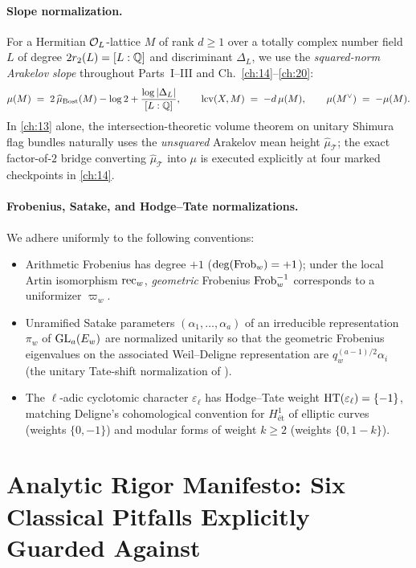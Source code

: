 \paragraph{Slope normalization.}
For a Hermitian $\mathcal{O}_L$-lattice $M$ of rank $d \ge 1$ over a totally complex number field $L$ of degree $2 r_2(L) = [L:\mathbb{Q}]$ and discriminant $\Delta_L$, we use the \emph{squared-norm Arakelov slope} throughout Parts~I--III and Ch.~\ref{ch:14}--\ref{ch:20}:
\begin{equation}
\label{eq:00:squared-slope}
  \mu(M) \;=\; 2\,\widehat{\mu}_{\mathrm{Bost}}(M) - \log 2 + \frac{\log|\Delta_L|}{[L:\mathbb{Q}]}, \qquad
  \operatorname{lcv}(X, M) \;=\; -d\,\mu(M), \qquad \mu(M^\vee) \;=\; -\mu(M).
\end{equation}
In \cref{ch:13} alone, the intersection-theoretic volume theorem on unitary Shimura flag bundles naturally uses the \emph{unsquared} Arakelov mean height $\widehat{\mu}_{\mathcal{T}}$; the exact factor-of-$2$ bridge converting $\widehat{\mu}_{\mathcal{T}}$ into $\mu$ is executed explicitly at four marked checkpoints in \cref{ch:14}.

\paragraph{Frobenius, Satake, and Hodge--Tate normalizations.}
We adhere uniformly to the following conventions:
\begin{itemize}
\item Arithmetic Frobenius has degree $+1$ ($\deg(\mathrm{Frob}_w) = +1$); under the local Artin isomorphism $\mathrm{rec}_w$, \emph{geometric} Frobenius $\mathrm{Frob}_w^{-1}$ corresponds to a uniformizer $\varpi_w$.
\item Unramified Satake parameters $(\alpha_1,\dots,\alpha_a)$ of an irreducible representation $\pi_w$ of $\mathrm{GL}_a(E_w)$ are normalized unitarily so that the geometric Frobenius eigenvalues on the associated Weil--Deligne representation are $q_w^{(a-1)/2}\alpha_i$ (the unitary Tate-shift normalization of \cite{BLGGT2014,HarrisTaylor2001}).
\item The $\ell$-adic cyclotomic character $\varepsilon_\ell$ has Hodge--Tate weight $\mathrm{HT}(\varepsilon_\ell) = \{-1\}$, matching Deligne's cohomological convention for $H^1_{\text{\'et}}$ of elliptic curves (weights $\{0, -1\}$) and modular forms of weight $k \ge 2$ (weights $\{0, 1-k\}$).
\end{itemize}

\section{Analytic Rigor Manifesto: Six Classical Pitfalls Explicitly Guarded Against}
\label{sec:00:manifesto}

